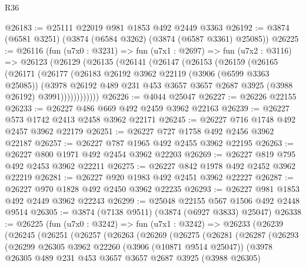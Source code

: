 \begin{lexlean}{R36}
\begin{coremodule}
@26183 := @25111 @22019 @981 @1853 @492 @2449 @3363
@26192 := @3874 (@6581 @3251) (@3874 (@6584 @3262) (@3874 (@6587 @3361) @25085))
@26225 := @26116
    (fun (u7x0 : @3231) =>
    fun (u7x1 : @2697) =>
    fun (u7x2 : @3116) =>
    @26123
      (@26129
        (@26135
          (@26141
            (@26147
              (@26153
                (@26159
                  (@26165
                    (@26171
                      (@26177
                        (@26183
                          @26192
                          @3962
                          @22119
                          (@3906 (@6599 @3363 @25085))
                          (@3978
                            @26192
                            @489
                            @231
                            @453
                            @3657
                            @3657
                            @2687
                            @3925
                            (@3988 @26192)
                            @3991))))))))))))
@26226 := @4044 @25047
@26227 := @26226 @22155
@26233 := @26227 @486 @669 @492 @2459 @3962 @22163
@26239 := @26227 @573 @1742 @2413 @2458 @3962 @22171
@26245 := @26227 @716 @1748 @492 @2457 @3962 @22179
@26251 := @26227 @727 @1758 @492 @2456 @3962 @22187
@26257 := @26227 @787 @1965 @492 @2455 @3962 @22195
@26263 := @26227 @800 @1971 @492 @2454 @3962 @22203
@26269 := @26227 @819 @795 @492 @2453 @3962 @22211
@26275 := @26227 @842 @1978 @492 @2452 @3962 @22219
@26281 := @26227 @920 @1983 @492 @2451 @3962 @22227
@26287 := @26227 @970 @1828 @492 @2450 @3962 @22235
@26293 := @26227 @981 @1853 @492 @2449 @3962 @22243
@26299 := @25048 @22155 @567 @1506 @492 @2448 @9514
@26305 := @3874 (@7138 @9511) (@3874 (@6927 @3833) @25047)
@26338 := @26225
    (fun (u7x0 : @3242) =>
    fun (u7x1 : @3242) =>
    @26233
      (@26239
        (@26245
          (@26251
            (@26257
              (@26263
                (@26269
                  (@26275
                    (@26281
                      (@26287
                        (@26293
                          (@26299
                            @26305
                            @3962
                            @22260
                            (@3906 (@10871 @9514 @25047))
                            (@3978
                              @26305
                              @489
                              @231
                              @453
                              @3657
                              @3657
                              @2687
                              @3925
                              (@3988 @26305)

\end{coremodule}
\end{lexlean}
